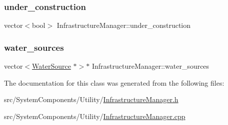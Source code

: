 \subsubsection{\texorpdfstring{under\+\_\+construction}{under\_construction}}
{\footnotesize\ttfamily vector$<$bool$>$ Infrastructure\+Manager\+::under\+\_\+construction\hspace{0.3cm}{\ttfamily [private]}}

\mbox{\label{classInfrastructureManager_a2b8810958d40b9c80d299c6db31715e2_a2b8810958d40b9c80d299c6db31715e2}} 
\subsubsection{\texorpdfstring{water\+\_\+sources}{water\_sources}}
{\footnotesize\ttfamily vector$<$\mbox{\hyperlink{classWaterSource}{Water\+Source}} $\ast$$>$$\ast$ Infrastructure\+Manager\+::water\+\_\+sources\hspace{0.3cm}{\ttfamily [private]}}



The documentation for this class was generated from the following files\+:\begin{DoxyCompactItemize}
\item 
src/\+System\+Components/\+Utility/\mbox{\hyperlink{InfrastructureManager_8h}{Infrastructure\+Manager.\+h}}\item 
src/\+System\+Components/\+Utility/\mbox{\hyperlink{InfrastructureManager_8cpp}{Infrastructure\+Manager.\+cpp}}\end{DoxyCompactItemize}
